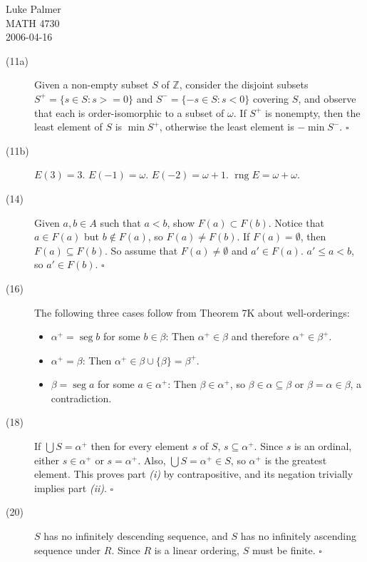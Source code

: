 \documentclass[12pt]{article}
\newcommand{\qed}{\hfill $\square$}
\DeclareMathOperator{\rng}{rng}
\DeclareMathOperator{\seg}{seg}
\begin{document}
\noindent 
Luke Palmer \\
MATH 4730 \\
2006-04-16

\begin{description}
\item [(11a)] Given a non-empty subset $S$ of $\mathbb{Z}$, consider the
disjoint subsets $S^+ = \{ s \in S: s >= 0 \}$ and $S^- = \{ -s \in S: s
< 0 \}$ covering $S$, and observe that each is order-isomorphic to a
subset of $\omega$.  If $S^+$ is nonempty, then the least element of $S$
is $\min S^+$, otherwise the least element is $-\min S^-$. \qed

\item [(11b)] $E(3) = 3$.  $E(-1) = \omega$.  $E(-2) = \omega+1$.
$\rng E = \omega + \omega$.

\item [(14)] Given $a,b \in A$ such that $a < b$, show $F(a) \subset
F(b)$.  Notice that $a \in F(a)$ but $b \not\in F(a)$, so $F(a) \not=
F(b)$.  If $F(a) = \emptyset$, then $F(a) \subseteq F(b)$.  So assume
that $F(a) \not= \emptyset$ and $a' \in F(a)$.  $a' \leq a < b$, so
$a' \in F(b)$. \qed

\item [(16)] The following three cases follow from Theorem 7K about
well-orderings:
 \begin{itemize}
 \item $\alpha^+ = \seg b$ for some $b \in \beta$: Then $\alpha^+ \in
   \beta$ and therefore $\alpha^+ \in \beta^+$.
 \item $\alpha^+ = \beta$: Then $\alpha^+ \in \beta \cup \{\beta\} =
   \beta^+$.
 \item $\beta = \seg a$ for some $a \in \alpha^+$:  Then $\beta \in
   \alpha^+$, so $\beta \in \alpha \subseteq \beta$ or $\beta = \alpha
   \in \beta$, a contradiction.
 \end{itemize}

\item [(18)] If $\bigcup S =
\alpha^+$ then for every element $s$ of $S$, $s \subseteq \alpha^+$.
Since $s$ is an ordinal, either $s \in \alpha^+$ or $s = \alpha^+$.
Also, $\bigcup S = \alpha^+ \in S$, so $\alpha^+$ is the greatest
element.  This proves part \textit{(i)} by contrapositive, and its
negation trivially implies part \textit{(ii)}.  \qed

\item [(20)] $S$ has no infinitely descending sequence, and $S$ has no
infinitely ascending sequence under $R$.  Since $R$ is a linear
ordering, $S$ must be finite.  \qed

\end{description}
\end{document}
